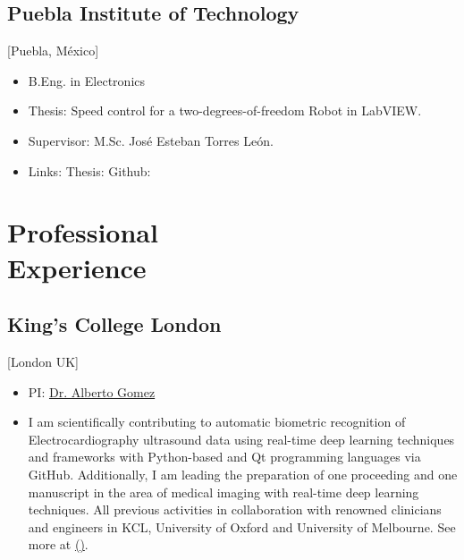 \documentclass{mycv}
\begin{document}
\subsection{Puebla Institute of Technology}[Puebla, M\'exico]
\vspace{-\parskip}%
\begin{itemize}[label={}]
  \item B.Eng. in Electronics 
  \item Thesis: Speed control for a two-degrees-of-freedom Robot in LabVIEW.
  \item Supervisor: M.Sc. Jos\'e Esteban Torres Le\'on.
  \item	Links: Thesis: \href{https://github.com/mxochicale/publications/blob/master/thesis/B.Eng./doc/MPXochicale_BachelorEngThesis-2003.pdf}{\faFilePdfO} Github: \href{https://github.com/mxochicale/publications/tree/master/thesis/B.Eng.}{\faGithubAlt}
\end{itemize}

\section{Professional \\ Experience}

\subsection{King's College London}[London UK]
\begin{positions}
\end{positions}
\begin{itemize}
  \item PI: \href{https://gomezalberto.github.io/}{Dr. Alberto Gomez}
  \item
I am scientifically contributing to automatic biometric recognition of Electrocardiography ultrasound data using real-time deep learning techniques and frameworks with Python-based and Qt programming languages via GitHub.
Additionally, I am leading the preparation of one proceeding and one manuscript in the area of medical imaging with real-time deep learning techniques.
All previous activities in collaboration with renowned clinicians and engineers in KCL, University of Oxford and University of Melbourne. 
See more at \href{http://vital.oucru.org/major-partners/kings-college-london/}{(\faExternalLink)}.
\end{itemize}
\end{document}
